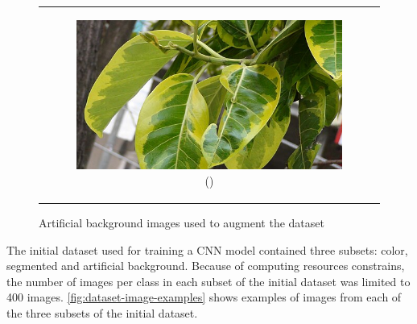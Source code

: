 \documentclass{BachelorBUI}
\begin{document}
\begin{figure}[h]
\begin{tabular}{c}
\begin{subfigure}{0.30\textwidth}
                    \includegraphics[width=\textwidth]{10_artificial_background.jpg}
                    \caption{\centering (\cite{10_artificial_background:2009})}
                \end{subfigure} \\
            \end{tabular}
            \caption{\centering Artificial background images used to augment the dataset}
            \label{fig:artificial-backgrounds}
        \end{figure}

        The initial dataset used for training a CNN model contained three subsets: color, segmented and artificial background. Because of computing resources constrains, the number of images per class in each subset of the initial dataset was limited to 400 images. \autoref{fig:dataset-image-examples} shows examples of images from each of the three subsets of the initial dataset.
\end{document}
